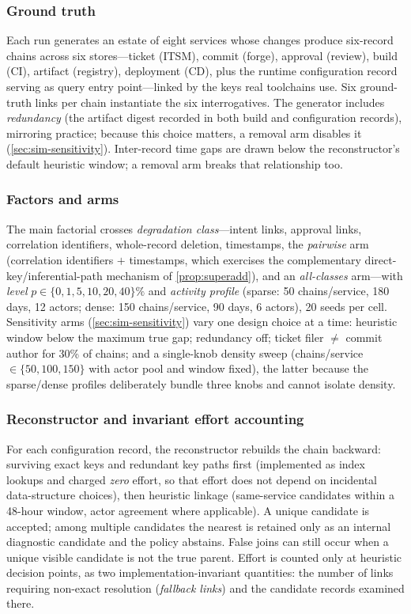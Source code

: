 \subsubsection{Ground truth}
Each run generates an estate of eight services whose changes produce six-record
chains across six stores---ticket (ITSM), commit (forge), approval (review),
build (CI), artifact (registry), deployment (CD), plus the runtime configuration
record serving as query entry point---linked by the keys real toolchains use.
Six ground-truth links per chain instantiate the six interrogatives. The
generator includes \emph{redundancy} (the artifact digest recorded in both build
and configuration records), mirroring practice; because this choice matters, a
removal arm disables it (\cref{sec:sim-sensitivity}). Inter-record time gaps are
drawn below the reconstructor's default heuristic window; a removal arm breaks
that relationship too.

\subsubsection{Factors and arms}
The main factorial crosses \emph{degradation class}---intent links, approval
links, correlation identifiers, whole-record deletion, timestamps, the
\emph{pairwise} arm (correlation identifiers $+$ timestamps, which exercises the
complementary direct-key/inferential-path mechanism of \cref{prop:superadd}), and
an \emph{all-classes} arm---with \emph{level}
$p \in \{0,1,5,10,20,40\}\%$ and \emph{activity profile} (sparse: 50
chains/service, 180 days, 12 actors; dense: 150 chains/service, 90 days, 6
actors), 20 seeds per cell. Sensitivity arms (\cref{sec:sim-sensitivity}) vary
one design choice at a time: heuristic window below the maximum true gap;
redundancy off; ticket filer $\ne$ commit author for 30\% of chains; and a
single-knob density sweep (chains/service $\in \{50,100,150\}$ with actor pool
and window fixed), the latter because the sparse/dense profiles deliberately
bundle three knobs and cannot isolate density.

\subsubsection{Reconstructor and invariant effort accounting}
For each configuration record, the reconstructor rebuilds the chain backward:
surviving exact keys and redundant key paths first (implemented as index
lookups and charged \emph{zero} effort, so that effort does not depend on
incidental data-structure choices), then heuristic linkage (same-service
candidates within a 48-hour window, actor agreement where applicable). A unique
candidate is accepted; among multiple candidates the nearest is retained only as
an internal diagnostic candidate and the policy abstains. False joins can still
occur when a unique visible candidate is not the true parent. Effort is counted only at
heuristic decision points, as two implementation-invariant quantities: the
number of links requiring non-exact resolution (\emph{fallback links}) and the
candidate records examined there.

